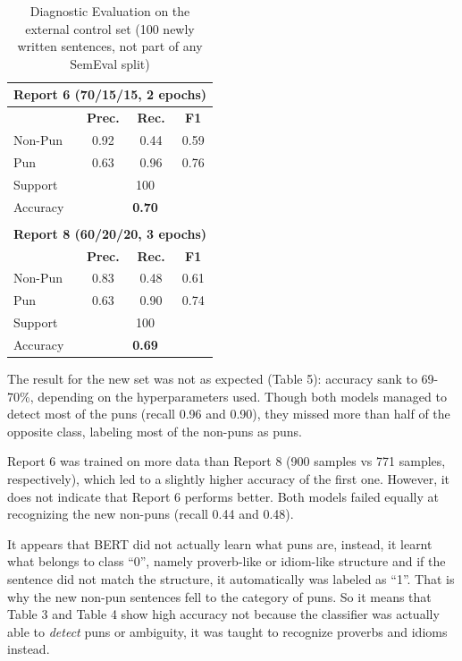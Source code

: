 \documentclass[11pt,a4paper]{article}
\begin{document}
\begin{table}[h]
\centering
\small 
\setlength{\tabcolsep}{5pt}
\begin{tabular}{l|ccc}
\hline
\multicolumn{4}{c}{\textbf{Report 6 (70/15/15, 2 epochs)}} \\
\hline
& \textbf{Prec.} & \textbf{Rec.} & \textbf{F1} \\
\hline
Non-Pun  & 0.92 & 0.44 & 0.59 \\
Pun      & 0.63 & 0.96 & 0.76 \\
\hline
Support  & \multicolumn{3}{c}{100} \\
Accuracy & \multicolumn{3}{c}{\textbf{0.70}} \\
\hline
\multicolumn{4}{c}{} \\ %
\hline
\multicolumn{4}{c}{\textbf{Report 8 (60/20/20, 3 epochs)}} \\
\hline
& \textbf{Prec.} & \textbf{Rec.} & \textbf{F1} \\
\hline
Non-Pun  & 0.83 & 0.48 & 0.61 \\
Pun      & 0.63 & 0.90 & 0.74 \\
\hline
Support  & \multicolumn{3}{c}{100} \\
Accuracy & \multicolumn{3}{c}{\textbf{0.69}} \\
\hline
\end{tabular}
\caption{Diagnostic Evaluation on the external control set (100 newly written sentences, not part of any SemEval split)}
\label{tab:diagnostic_eval}
\end{table}

The result for the new set was not as expected (Table 5): accuracy sank to 69-70\%, depending on the hyperparameters used. Though both models managed to detect most of the puns (recall 0.96 and 0.90), they missed more than half of the opposite class, labeling most of the non-puns as puns.


Report 6 was trained on more data than Report 8 (900 samples vs 771 samples, respectively), which led to a slightly higher accuracy of the first one. However, it does not indicate that Report 6 performs better. Both models failed equally at recognizing the new non-puns (recall 0.44 and 0.48).


It appears that BERT did not actually learn what puns are, instead, it learnt what belongs to class “0”, namely proverb-like or idiom-like structure and if the sentence did not match the structure, it automatically was labeled as “1”. That is why the new non-pun sentences fell to the category of puns. So it means that Table 3 and Table 4 show high accuracy not because the classifier was actually able to \textit{detect} puns or ambiguity, it was taught to recognize proverbs and idioms instead. 
\end{document}
